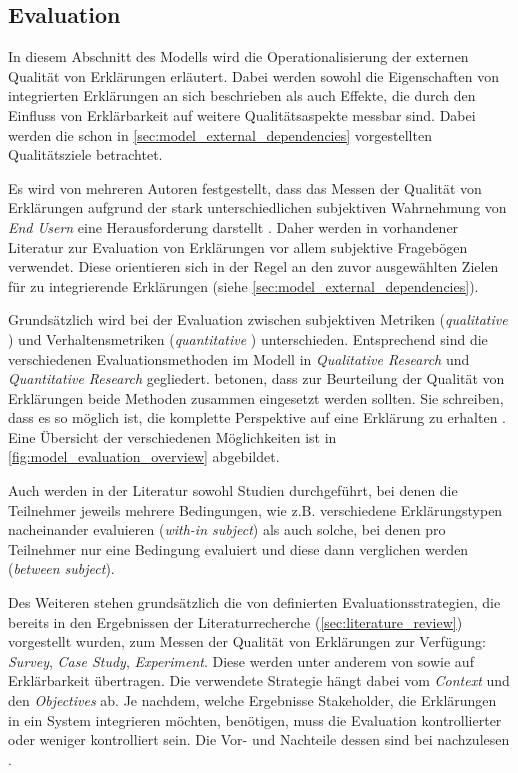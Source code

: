 \subsection{Evaluation}
\label{sec:model_evaluation_description}

In diesem Abschnitt des Modells wird die Operationalisierung der externen Qualität von Erklärungen erläutert. Dabei werden sowohl die Eigenschaften von integrierten Erklärungen an sich beschrieben als auch Effekte, die durch den Einfluss von Erklärbarkeit auf weitere Qualitätsaspekte messbar sind. Dabei werden die schon in \autoref{sec:model_external_dependencies} vorgestellten Qualitätsziele betrachtet.

Es wird von mehreren Autoren festgestellt, dass das Messen der Qualität von Erklärungen aufgrund der stark unterschiedlichen subjektiven Wahrnehmung von \textit{End Usern}  eine Herausforderung darstellt \cite{nunes_systematic_2017, eiband_impact_2019, kouki_user_2017}. Daher werden in vorhandener Literatur zur Evaluation von Erklärungen vor allem subjektive Fragebögen verwendet. Diese orientieren sich in der Regel an den zuvor ausgewählten Zielen für zu integrierende Erklärungen (siehe \autoref{sec:model_external_dependencies}).

Grundsätzlich wird bei der Evaluation zwischen subjektiven Metriken (\textit{qualitative} \cite{wohlin2012experimentation}) und Verhaltensmetriken (\textit{quantitative} \cite{wohlin2012experimentation}) unterschieden. Entsprechend sind die verschiedenen Evaluationsmethoden im Modell in \textit{Qualitative Research} und \textit{Quantitative Research} gegliedert. \citeauthor{waa_evaluating_2021} betonen, dass zur Beurteilung der Qualität von Erklärungen beide Methoden zusammen eingesetzt werden sollten. Sie schreiben, dass es so möglich ist, die \glqq komplette Perspektive\grqq{} auf eine Erklärung zu erhalten \cite[übersetzt vgl.][]{waa_evaluating_2021}. Eine Übersicht der verschiedenen Möglichkeiten ist in \autoref{fig:model_evaluation_overview} abgebildet.

Auch werden in der Literatur sowohl Studien durchgeführt, bei denen die Teilnehmer jeweils mehrere Bedingungen, wie z.B. verschiedene Erklärungstypen nacheinander evaluieren (\textit{with-in subject}) als auch solche, bei denen pro Teilnehmer nur eine Bedingung evaluiert und diese dann verglichen werden (\textit{between subject}).

Des Weiteren stehen grundsätzlich die von \citeauthor{wohlin2012experimentation} definierten Evaluationsstrategien, die bereits in den Ergebnissen der Literaturrecherche (\autoref{sec:literature_review}) vorgestellt wurden, zum Messen der Qualität von Erklärungen zur Verfügung: \textit{Survey}, \textit{Case Study}, \textit{Experiment}. Diese werden unter anderem von \citeauthor{ribera2019can} sowie \citeauthor{doshi2017towards} auf Erklärbarkeit übertragen. Die verwendete Strategie hängt dabei vom \textit{Context} und den \textit{Objectives} ab. Je nachdem, welche Ergebnisse Stakeholder, die Erklärungen in ein System integrieren möchten, benötigen, muss die Evaluation kontrollierter oder weniger kontrolliert sein. Die Vor- und Nachteile dessen sind bei \citeauthor{wohlin2012experimentation} nachzulesen \cite{wohlin2012experimentation}.

